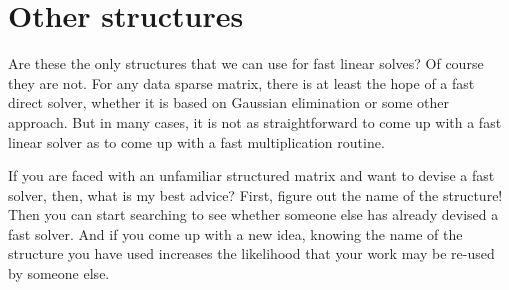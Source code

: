 \section{Other structures}

Are these the only structures that we can use for fast linear solves?
Of course they are not.  For any data sparse matrix, there is at least
the hope of a fast direct solver, whether it is based on Gaussian
elimination or some other approach.  But in many cases, it is not
as straightforward to come up with a fast linear solver as to come
up with a fast multiplication routine.

If you are faced with an unfamiliar structured matrix and want to
devise a fast solver, then, what is my best advice?  First, figure
out the name of the structure!  Then you can start searching to see
whether someone else has already devised a fast solver.  And if you
come up with a new idea, knowing the name of the structure you have
used increases the likelihood that your work may be re-used by
someone else. 
